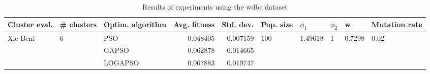 \begin{table}
\centering
\caption{Results of experiments using the wdbc dataset}
\begin{tabular}{lllrrlllll}
\toprule
            Cluster eval. &        \# clusters & Optim. algorithm &  Avg. fitness &  Std. dev. &            Pop. size &               $\phi_{1}$ &         $\phi_{2}$ &                       w &         Mutation rate \\
\midrule
\multirow{3}{*}{Xie Beni} & \multirow{3}{*}{6} &              PSO &      0.048405 &   0.007159 & \multirow{3}{*}{100} & \multirow{3}{*}{1.49618} & \multirow{3}{*}{1} & \multirow{3}{*}{0.7298} & \multirow{3}{*}{0.02} \\
                          &                    &            GAPSO &      0.062878 &   0.014665 &                      &                          &                    &                         &                       \\
                          &                    &          LOGAPSO &      0.067883 &   0.019747 &                      &                          &                    &                         &                       \\
\bottomrule
\end{tabular}
\end{table}
